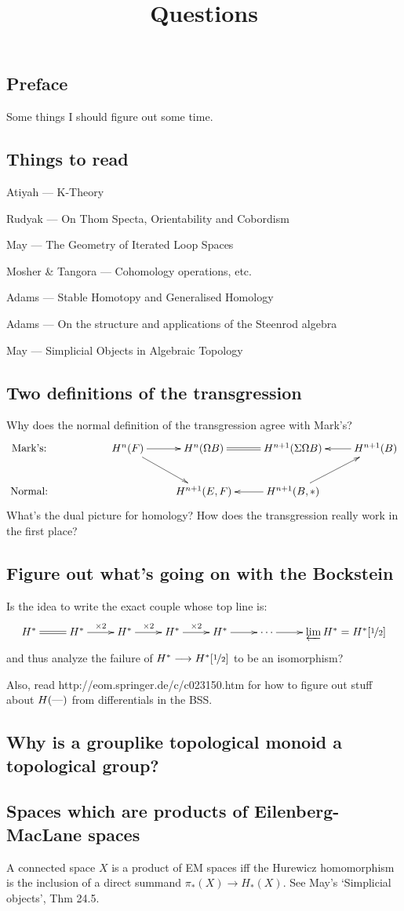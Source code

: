 \documentclass[11pt]{article}
\title{Questions}
\begin{document}
\tableofcontents
\newcommand{\HSsection}[2]{\subsection{#1}}

\tableofcontents

\HSsection{Preface}{}
Some things I should figure out some time.

\HSsection{Things to read}{}
\newcommand{\BooK}[2]{\item #1 --- #2}
\begin{itemise}
\BooK{Atiyah}{K-Theory}
\BooK{Rudyak}{On Thom Specta, Orientability and Cobordism}
\BooK{May}{The Geometry of Iterated Loop Spaces}
\BooK{Mosher \& Tangora}{Cohomology operations, etc.}
\BooK{Adams}{Stable Homotopy and Generalised Homology}
\BooK{Adams}{On the structure and applications of the Steenrod algebra}
\BooK{May}{Simplicial Objects in Algebraic Topology}
\end{itemise}

\HSsection{Two definitions of the transgression}{29/6/11}
Why does the normal definition of the transgression agree with Mark's?
\[\xymatrix{
\text{Mark's:}&&\ar[dr]H^n(F)\ar[r]& H^n(\Omega B)\ar@{=}[r]&H^{n+1}(\Sigma\Omega B)&\ar[l] H^{n+1}(B)\\
\text{Normal:}&&&H^{n+1}(E,F)&H^{n+1}(B,*)\ar[ru]\ar[l]
}\]
What's the dual picture for homology?
How does the transgression really work in the first place?
\HSsection{Figure out what's going on with the Bockstein}{30/6/11}
Is the idea to write the exact couple whose top line is:
\[\xymatrix{
H^*\ar@{=}[r]&H^*\ar[r]^{\times2}&H^*\ar[r]^{\times2}&H^*\ar[r]^{\times2}&H^*\ar[r]&\cdots\ar[r]&\varprojlim H^*=H^*[\nicefrac{1}{2}]
}\]
and thus analyze the failure of $H^*\to H^*[\nicefrac{1}{2}]$ to be an isomorphism?

Also, read http://eom.springer.de/c/c023150.htm for how to figure out stuff about $H(\DASH)$ from differentials in the BSS.
\HSsection{Why is a grouplike topological monoid a topological group?}{30/6/11}

\HSsection{Spaces which are products of Eilenberg-MacLane spaces}{6/7/11}
A connected space $X$ is a product of EM spaces iff the Hurewicz homomorphism is the 
inclusion of a direct summand $\pi_*(X)\to H_*(X)$. See May's `Simplicial objects',
Thm 24.5.
\end{document}
